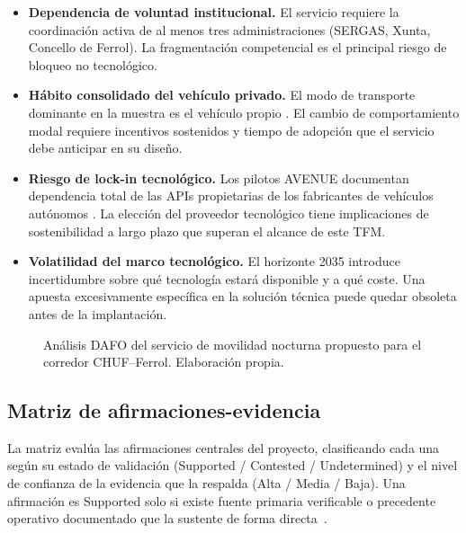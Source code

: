 \begin{itemize}

	\item \textbf{Dependencia de voluntad institucional.}
	El servicio requiere la coordinación activa de al menos
	tres administraciones (SERGAS, Xunta, Concello de Ferrol).
	La fragmentación competencial es el principal riesgo
	de bloqueo no tecnológico.

	\item \textbf{Hábito consolidado del vehículo privado.}
	El modo de transporte dominante en la muestra es el
	vehículo propio \parencite{LouridoRegueira2026}. El
	cambio de comportamiento modal requiere incentivos
	sostenidos y tiempo de adopción que el servicio debe
	anticipar en su diseño.

	\item \textbf{Riesgo de lock-in tecnológico.} Los
	pilotos AVENUE documentan dependencia total de las
	APIs propietarias de los fabricantes de vehículos
	autónomos \parencite{AVENUE2023}. La elección del
	proveedor tecnológico tiene implicaciones de
	sostenibilidad a largo plazo que superan el alcance
	de este TFM.

	\item \textbf{Volatilidad del marco tecnológico.}
	El horizonte 2035 introduce incertidumbre sobre qué
	tecnología estará disponible y a qué coste. Una
	apuesta excesivamente específica en la solución
	técnica puede quedar obsoleta antes de la implantación.

\end{itemize}

\begin{figure}[htbp]
	\centering
	\fbox{\rule{0pt}{7cm}\rule{0.95\textwidth}{0pt}}
	\caption{Análisis DAFO del servicio de movilidad nocturna
		propuesto para el corredor CHUF--Ferrol. Elaboración propia.}
	\label{fig:dafo}
\end{figure}




\subsection{Matriz de afirmaciones-evidencia}
\label{sec:matriz-evidencia}

La matriz evalúa las afirmaciones centrales del proyecto,
clasificando cada una según su estado de validación
(Supported / Contested / Undetermined) y el nivel de confianza
de la evidencia que la respalda (Alta / Media / Baja). Una
afirmación es Supported solo si existe fuente primaria
verificable o precedente operativo documentado que la sustente
de forma directa~\parencite{LouridoRegueira2026}.

